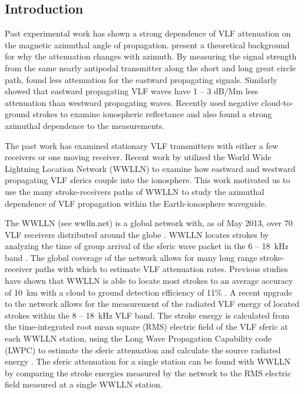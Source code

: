 \documentclass[draft,jgrga]{AGUTeX}
\begin{document}
\begin{article}

\section{Introduction}

Past experimental work has shown a strong dependence of VLF attenuation on the magnetic azimuthal angle of propagation.
\citet{Wait1960a} present a theoretical background for why the attenuation changes with azimuth.
By measuring the signal strength from the same nearly antipodal transmitter along the short and long great circle path, \citet{Crombie1958} found less attenuation for the eastward propagating signals.
Similarly \citet{Taylor1960a} showed that eastward propagating VLF waves have 1 -- 3 dB/Mm less attenuation than westward propagating waves.
Recently \citet{Jacobson2012} used negative cloud-to-ground strokes to examine ionospheric reflectance and also found a strong azimuthal dependence to the measurements.

The past work has examined stationary VLF transmitters with either a few receivers or one moving receiver.
Recent work by \citet{Burkholder2013} utilized the World Wide Lightning Location Network (WWLLN) to examine how eastward and westward propagating VLF sferics couple into the ionosphere.
This work motivated us to use the many stroke-receivers paths of WWLLN to study the azimuthal dependence of VLF propagation within the Earth-ionosphere waveguide.

The WWLLN (see wwlln.net) is a global network with, as of May 2013, over 70 VLF receivers distributed around the globe \citep{Rodger2006, Rodger2009}.
WWLLN locates strokes by analyzing the time of group arrival of the sferic wave packet in the 6 -- 18~kHz band \citep{Dowden2000}.
The global coverage of the network allows for many long range stroke-receiver paths with which to estimate VLF attenuation rates.
Previous studies have shown that WWLLN is able to locate most strokes to an average accuracy of 10~km with a cloud to ground detection efficiency of 11\% \citep{Abarca2010, Rodger2009}.
A recent upgrade to the network allows for the measurement of the radiated VLF energy of located strokes within the 8 -- 18~kHz VLF band.
The stroke energy is calculated from the time-integrated root mean square (RMS) electric field of the VLF sferic at each WWLLN station, using the Long Wave Propagation Capability code (LWPC) \citep{Ferguson1998} to estimate the sferic attenuation and calculate the source radiated energy \citep{Hutchins2012}.
The sferic attenuation for a single station can be found with WWLLN by comparing the stroke energies measured by the network to the RMS electric field measured at a single WWLLN station.


\end{article}
\end{document}

